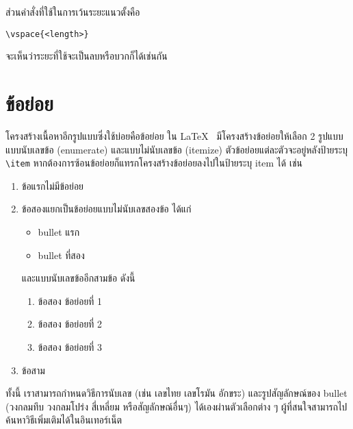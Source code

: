 \vspace{-1.5cm}
ส่วนคำสั่งที่ใช้ในการเว้นระยะแนวตั้งคือ
\begin{lstlisting}[numbers=none]
	\vspace{<length>}
\end{lstlisting}
จะเห็นว่าระยะที่ใช้จะเป็นลบหรือบวกก็ได้เช่นกัน


\section{ข้อย่อย}
โครงสร้างเนื้อหาอีกรูปแบบซึ่งใช้บ่อยคือข้อย่อย ใน \LaTeX~ มีโครงสร้างข้อย่อยให้เลือก 2 รูปแบบ แบบนับเลขข้อ (enumerate) และแบบไม่นับเลขข้อ (itemize) ตัวข้อย่อยแต่ละตัวจะอยู่หลังป้ายระบุ \lstinline|\item| หากต้องการซ้อนข้อย่อยก็แทรกโครงสร้างข้อย่อยลงไปในป้ายระบุ item ได้ เช่น
\begin{enumerate}
	\item ข้อแรกไม่มีข้อย่อย
	\item ข้อสองแยกเป็นข้อย่อยแบบไม่นับเลขสองข้อ ได้แก่
	\begin{itemize}
		\item bullet แรก
		\item bullet ที่สอง
	\end{itemize}
	และแบบนับเลขข้ออีกสามข้อ ดังนี้
	\begin{enumerate}
		\item ข้อสอง ข้อย่อยที่ 1
		\item ข้อสอง ข้อย่อยที่ 2
		\item ข้อสอง ข้อย่อยที่ 3
	\end{enumerate}
	\item ข้อสาม
\end{enumerate}
ทั้งนี้ เราสามารถกำหนดวิธีการนับเลข (เช่น เลขไทย เลขโรมัน อักขระ) และรูปสัญลักษณ์ของ bullet (วงกลมทึบ วงกลมโปร่ง สี่เหลี่ยม หรือสัญลักษณ์อื่นๆ) ได้เองผ่านตัวเลือกต่าง ๆ ผู้ที่สนใจสามารถไปค้นหาวิธีเพิ่มเติมได้ในอินเทอร์เน็ต

